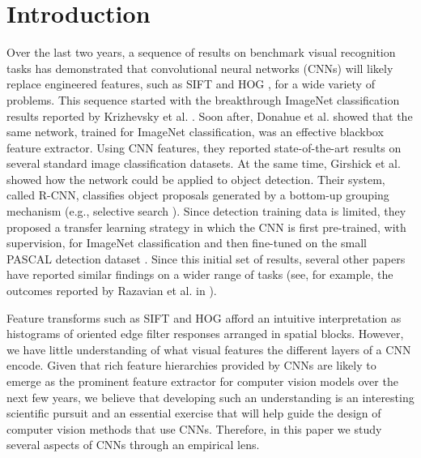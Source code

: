 \section{Introduction}

Over the last two years, a sequence of results on benchmark visual recognition tasks has demonstrated that convolutional neural networks (CNNs) \cite{fukushima1980neocognitron,Lecun89,rumelhart86} will likely replace engineered features, such as SIFT \cite{Sift} and HOG \cite{Hog}, for a wide variety of problems.
This sequence started with the breakthrough ImageNet \cite{imagenet} classification results reported by Krizhevsky et al. \cite{Kriz}.
Soon after, Donahue et al. \cite{Decaf} showed that the same network, trained for ImageNet classification, was an effective blackbox feature extractor.
Using CNN features, they reported state-of-the-art results on several standard image classification datasets.
At the same time, Girshick et al. \cite{Rcnn} showed how the network could be applied to object detection.
Their system, called R-CNN, classifies object proposals generated by a bottom-up grouping mechanism (e.g., selective search \cite{UijlingsIJCV2013}).
Since detection training data is limited, they proposed a transfer learning strategy in which the CNN is first pre-trained, with supervision, for ImageNet classification and then fine-tuned on the small PASCAL detection dataset \cite{Pascal}.
Since this initial set of results, several other papers have reported similar findings on a wider range of tasks (see, for example, the outcomes reported by Razavian et al. in \cite{astounding}).

Feature transforms such as SIFT and HOG afford an intuitive interpretation as histograms of oriented edge filter responses arranged in spatial blocks.
However, we have little understanding of what visual features the different layers of a CNN encode.
Given that rich feature hierarchies provided by CNNs are likely to emerge as the prominent feature extractor for computer vision models over the next few years, we believe that developing such an understanding is an interesting scientific pursuit and an essential exercise that will help guide the design of computer vision methods that use CNNs.
Therefore, in this paper we study several aspects of CNNs through an empirical lens.

